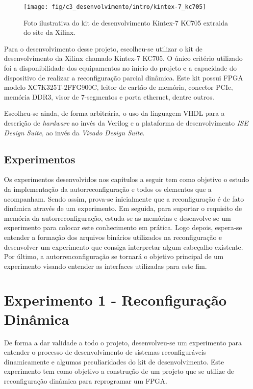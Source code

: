 \documentclass[11pt,a4paper,oneside]{book}
\begin{document}
\begin{figure}[h]
\centering
\texttt{[image: fig/c3\_desenvolvimento/intro/kintex-7\_kc705]}
\caption{Foto ilustrativa do kit de desenvolvimento Kintex-7 KC705 extraida do site da Xilinx.}
\label{fig:kc705}
\end{figure} 

Para o desenvolvimento desse projeto, escolheu-se utilizar o kit de desenvolvimento da Xilinx\textregistered{} chamado Kintex-7 KC705.
O único critério utilizado foi a disponibilidade dos equipamentos no início do projeto e a capacidade do dispositivo de realizar a reconfiguração parcial dinâmica.
Este kit possui FPGA modelo XC7K325T-2FFG900C, leitor de cartão de memória, conector PCIe\textregistered{}, memória DDR3, visor de 7-segmentos e porta ethernet, dentre outros.

Escolheu-se ainda, de forma arbitrária, o uso da linguagem VHDL para a descrição de \textit{hardware} ao invés da Verilog e a plataforma de desenvolvimento \textit{ISE Design Suite}, ao invés da \textit{Vivado Design Suite}.

\section{Experimentos}
Os experimentos desenvolvidos nos capítulos a seguir tem como objetivo o estudo da implementação da autorreconfiguração e todos os elementos que a acompanham.
Sendo assim, prova-se inicialmente que a reconfiguração é de fato dinâmica através de um experimento.
Em seguida, para suportar o requisito de memória da autorreconfiguração, estuda-se as memórias e desenvolve-se um experimento para colocar este conhecimento em prática.
Logo depois, espera-se entender a formação dos arquivos binários utilizados na reconfiguração e desenvolver um experimento que consiga interpretar algum cabeçalho existente.
Por último, a autorrenconfiguração se tornará o objetivo principal de um experimento visando entender as interfaces utilizadas para este fim. 


\chapter{Experimento 1 - Reconfiguração Dinâmica}
De forma a dar validade a todo o projeto, desenvolveu-se um experimento para entender o processo de desenvolvimento de sistemas reconfiguráveis dinamicamente e algumas peculiaridades do kit de desenvolvimento.
Este experimento tem como objetivo a construção de um projeto que se utilize de reconfiguração dinâmica para reprogramar um FPGA.
\end{document}
